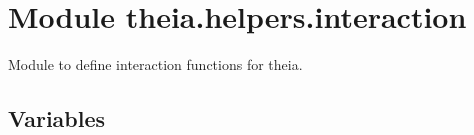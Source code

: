 %
%
%


\section{Module theia.helpers.interaction}

    \label{theia:helpers:interaction}
Module to define interaction functions for theia.



  \subsection{Variables}

